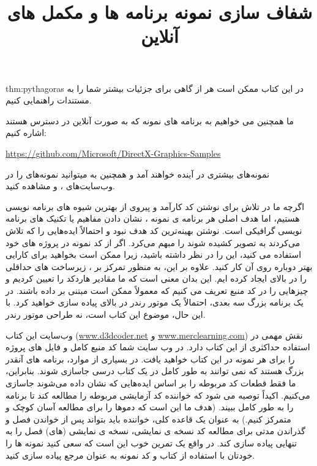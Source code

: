 {    \begin{theo}{thm:pythagoras}
        در این کتاب ممکن است هر از گاهی برای جزئیات بیشتر شما را به مستندات راهنمایی کنیم.
    \end{theo}
    ما همچنین می خواهیم به برنامه های نمونه  که به صورت آنلاین در دسترس هستند اشاره کنیم:

    \begin{flushleft}
        \href{https://github.com/Microsoft/DirectX-Graphics-Samples}{https://github.com/Microsoft/DirectX-Graphics-Samples}
    \end{flushleft}

    نمونه‌های بیشتری در آینده خواهند آمد و همچنین به میتوانید نمونه‌های  را در وب‌سایت‌های ،  و  مشاهده کنید.
} %
\textbf{\vspace{25pt}}

\title{
    \LARGE
    \textbf{شفاف سازی}
} \rullFillWithLine[0.5em]{1pt}
\textbf{\vspace{12pt}}

{
    \Large
    اگرچه ما در تلاش برای نوشتن کد کارآمد و پیروی از بهترین شیوه های برنامه نویسی  هستیم، اما هدف اصلی هر برنامه ی نمونه ، نشان دادن مفاهیم  یا تکنیک های برنامه نویسی گرافیکی است.
    نوشتن بهینه‌ترین کد هدف نبود و احتمالاً ایده‌هایی را که تلاش می‌کردند به تصویر کشیده شوند را مبهم می‌کرد.
    اگر از کد نمونه در پروژه های خود استفاده می کنید، این را در نظر داشته باشید، زیرا ممکن است بخواهید برای کارایی بهتر دوباره روی آن کار کنید.
    علاوه بر این، به منظور تمرکز بر ، زیرساخت های حداقلی را در بالای  ایجاد کرده ایم. این بدان معنی است که ما مقادیر هاردکد را تعیین کردیم و چیزهایی را در کد منبع تعریف می کنیم که معمولاً ممکن است مبتنی بر داده باشند.
    در یک برنامه بزرگ سه بعدی، احتمالاً یک موتور رندر در بالای  پیاده سازی خواهید کرد. با این حال، موضوع این کتاب  است، نه طراحی موتور رندر.
}
\textbf{\vspace{25pt}}

\title{
    \LARGE
    \textbf{نمونه برنامه ها و مکمل های آنلاین}
} \rullFillWithLine[0.5em]{1pt}
\textbf{\vspace{12pt}}

{
    \Large
    وب‌سایت این کتاب (\href{www.d3dcoder.net}{www.d3dcoder.net} و \href{www.merclearning.com}{www.merclearning.com}) نقش مهمی در استفاده حداکثری از این کتاب دارد.
در وب سایت شما کد منبع کامل و فایل های پروژه را برای هر نمونه در این کتاب خواهید یافت.
در بسیاری از موارد، برنامه های  آنقدر بزرگ هستند که نمی توانند به طور کامل در یک کتاب درسی جاسازی شوند. بنابراین، ما فقط قطعات کد مربوطه را بر اساس ایده‌هایی که نشان داده می‌شوند جاسازی می‌کنیم.
اکیداً توصیه می شود که خواننده کد آزمایشی مربوطه را مطالعه کند تا برنامه را به طور کامل ببیند. (هدف ما این است که دموها را برای مطالعه آسان کوچک و متمرکز کنیم.) به عنوان یک قاعده کلی، خواننده باید بتواند پس از خواندن فصل و گذراندن مدتی برای مطالعه کد نسخه ی نمایشی، نسخه ی نمایشی (های) فصل را به تنهایی پیاده سازی کند.
در واقع یک تمرین خوب این است که سعی کنید نمونه ها را خودتان با استفاده از کتاب و کد نمونه به عنوان مرجع پیاده سازی کنید.
}
\textbf{\vspace{25pt}}

